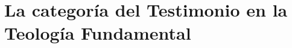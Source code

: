 \documentclass[../main.tex]{subfiles}
\begin{document}
\chapter{La categoría del Testimonio en la Teología Fundamental}





%

%

%
\end{document}
